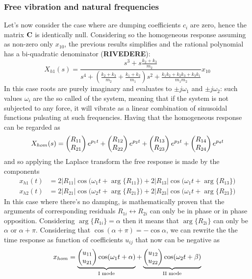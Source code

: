 \subsubsection{Free vibration and natural frequencies}
	Let's now consider the case where are dumping coefficients $c_i$ are zero, hence the matrix $\mat C$ is identically null. Considering so the homogeneous response assuming as non-zero only $x_{10}$, the previous results simplifies and the rational polynomial has a bi-quadratic denominator (\textbf{RIVEDERE}):
	\[ X_{h1}(s) = \frac{s^3 + s \frac{k_2+ k_3}{m_2}}{ s^4 + \left( \frac{k_2 + k_3}{m_2} + \frac{k_1 + k_2}{m_1} \right) s^2 + \frac{k_1 k_2 + k_2 k_3 + k_3 k_1}{m_1 m_2} } x_{10} \]
	In this case roots are purely imaginary and evaluates to $\pm j \omega_1$ and $\pm j \omega_2$: such values $\omega_i$ are the so called  of the system, meaning that if the system is not subjected to any force, it will vibrate as a linear combination of sinusoidal functions pulsating at such frequencies. Having that the homogeneous response can be regarded as
	\[ X_{hom}(s) = \vec{R_{11} \\ R_{21} } e^{p_1 t} + \vec{R_{12} \\ R_{22} } e^{p_2 t} + \vec{R_{13} \\ R_{23} } e^{p_3 t} + \vec{R_{14} \\ R_{24} } e^{p_4 t} \]
	and so applying the Laplace transform the free response is made by the components
	\begin{align*}
		x_{h1}(t) &= 2 |R_{11}| \cos\big(\omega_1 t + \arg\{R_{11}\}\big) + 2 |R_{13}| \cos\big(\omega_1 t + \arg\{R_{13}\}\big) \\
		x_{h2}(t) &= 2 |R_{21}| \cos\big(\omega_2 t + \arg\{R_{21}\}\big) + 2 |R_{23}| \cos\big(\omega_1 t + \arg\{R_{23}\}\big) 		
	\end{align*}
	In this case where there's no damping, is mathematically proven that the arguments of corresponding residuals $R_{1i}\leftrightarrow R_{2i}$ can only be in phase or in phase opposition. Considering $\arg\{R_{1i}\} = \alpha$ then it means that $\arg\{R_{2i}\}$ can only be $\alpha$ or $\alpha +\pi$. Considering that $\cos(\alpha + \pi) = -\cos\alpha$, we can rewrite the the time response as function of coefficients $u_{ij}$ that now can be negative as
	\begin{equation} \label{eq:2dof:homogeneousresponse}
		 x_{hom} = \underbrace{\vec{u_{11} \\ u_{21}} \cos(\omega_1 t + \alpha)}_\textrm{I mode} + \underbrace{\vec{u_{12} \\ u_{22}} \cos(\omega_2 t + \beta)}_\textrm{II mode}
	\end{equation}
